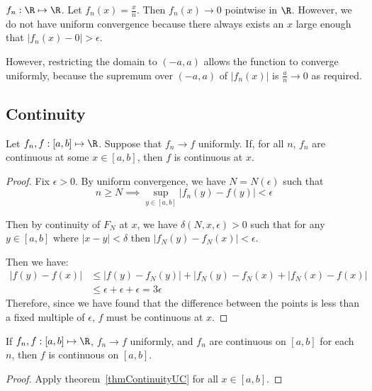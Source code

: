 \documentclass[../Main.tex]{subfiles}
\begin{document}
\begin{example}
    $f_n : \R \mapsto \R$. Let $f_n(x) = \frac{x}{n}$. Then $f_n(x) \to 0$ pointwise in $\R$. However, we do not have uniform convergence because there always exists an $x$ large enough that $|f_n(x) - 0| > \epsilon$.

    However, restricting the domain to $(-a, a)$ allows the function to converge uniformly, because the supremum over $(-a, a)$ of $|f_n(x)|$ is $\frac{a}{n} \to 0$ as required.
\end{example}
\subsection{Continuity}
\begin{theorem}
    Let $f_n, f : [a, b] \mapsto \R$. Suppose that $f_n \to f$ uniformly. If, for all $n$, $f_n$ are continuous at some $x \in [a, b]$, then $f$ is continuous at $x$.
    \label{thmContinuityUC}
\end{theorem}
\begin{proof}
    Fix $\epsilon > 0$. By uniform convergence, we have $N = N(\epsilon)$ such that
    \begin{equation*}
        n \geq N \implies \sup_{y \in [a, b]} |f_n(y) - f(y)| < \epsilon
    \end{equation*}

    Then by continuity of $F_N$ at $x$, we have $\delta(N, x, \epsilon) > 0$ such that for any $y \in [a, b]$ where $|x - y| < \delta$ then $|f_N(y) - f_N(x)| < \epsilon$.
    
    Then we have:
    \begin{align*}
        |f(y) - f(x)| &\leq |f(y) - f_N(y)| + |f_N(y) - f_N(x) + |f_N(x) - f(x)| \\
        &\leq \epsilon + \epsilon + \epsilon = 3\epsilon
    \end{align*}
    Therefore, since we have found that the difference between the points is less than a fixed multiple of $\epsilon$, $f$ must be continuous at $x$.
\end{proof}
\begin{corollary}
    If $f_n, f : [a, b] \mapsto \R$, $f_n \to f$ uniformly, and $f_n$ are continuous on $[a, b]$ for each $n$, then $f$ is continuous on $[a, b]$.
    \label{corLimitCtsUC}
\end{corollary}
\begin{proof}
    Apply theorem~\ref{thmContinuityUC} for all $x \in [a, b]$.
\end{proof}
\end{document}
